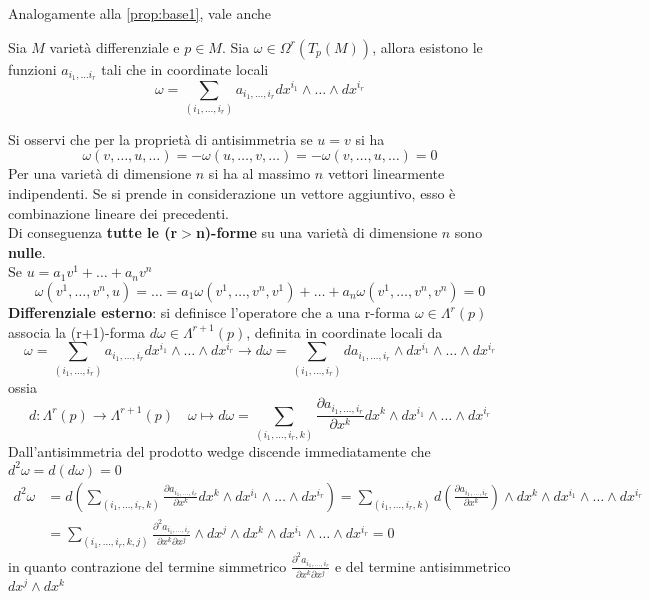 Analogamente alla \ref{prop:base1}, vale anche
\begin{proposition}\label{prop:base2}
   Sia $M$ varietà differenziale e $p \in M$. Sia $\omega \in \Omega^r(T_p(M))$,
   allora esistono le funzioni $a_{i_1,\dots i_r}$ tali che in coordinate locali\\
   $$
      \omega = \sum_{(i_1,\dots, i_r)} a_{i_1,\dots, i_r}
         dx^{i_1} \wedge \dots \wedge dx^{i_r}
   $$
\end{proposition}

Si osservi che per la proprietà di antisimmetria se $u = v$ si ha
$$\omega(v,\dots,u,\dots) = - \omega(u,\dots,v,\dots) = - \omega(v,\dots,u,\dots) = 0$$
Per una varietà di dimensione $n$ si ha al massimo $n$ vettori linearmente indipendenti.
Se si prende in considerazione un vettore aggiuntivo, esso è combinazione lineare dei precedenti.\\
Di conseguenza \textbf{tutte le (r$>$n)-forme} su una varietà di dimensione $n$ sono \textbf{nulle}.\\
Se $u= a_1v^1 + \dots + a_nv^n$
$$
   \omega(v^1,\dots,v^n,u) = \dots = a_1\omega(v^1,\dots,v^n,v^1) + \dots
      + a_n\omega(v^1,\dots,v^n,v^n) = 0
$$
\textbf{Differenziale esterno}: si definisce l'operatore che a una r-forma
$\omega \in \Lambda^r(p)$ associa la (r+1)-forma $d\omega \in \Lambda^{r+1}(p)$,
definita in coordinate locali da\\
$$
   \omega = \sum_{(i_1,\dots, i_r)} a_{i_1,\dots, i_r}
      dx^{i_1} \wedge \dots \wedge dx^{i_r} \to
   d\omega = \sum_{(i_1,\dots, i_r)} da_{i_1,\dots, i_r}\wedge
      dx^{i_1} \wedge \dots \wedge dx^{i_r}
$$
ossia
$$
   d : \Lambda^r(p) \to \Lambda^{r+1}(p) \quad \omega \mapsto
   d\omega = \sum_{(i_1,\dots, i_r,k)} \frac {\partial a_{i_1,\dots, i_r}}{\partial x^k} dx^k
   \wedge dx^{i_1} \wedge \dots \wedge dx^{i_r}
$$
Dall'antisimmetria del prodotto wedge discende immediatamente che $d^2\omega = d(d\omega) = 0$
\begin{equation*}
   \begin{split}
      d^2\omega & = d \left( \sum_{(i_1,\dots, i_r,k)}
            \frac {\partial a_{i_1,\dots, i_r}}{\partial x^k} dx^k
               \wedge dx^{i_1} \wedge \dots \wedge dx^{i_r} \right)
          = \sum_{(i_1,\dots, i_r,k)}
            d\left( \frac {\partial a_{i_1,\dots, i_r}}{\partial x^k} \right)
               \wedge dx^k \wedge dx^{i_1} \wedge \dots \wedge dx^{i_r} \\
       & = \sum_{(i_1,\dots, i_r,k,j)}
            \frac {\partial^2 a_{i_1,\dots, i_r}}{\partial x^k \partial x^j}
               \wedge dx^j \wedge dx^k \wedge dx^{i_1} \wedge \dots \wedge dx^{i_r}
         = 0
   \end{split}
\end{equation*}
in quanto contrazione del termine simmetrico $\frac {\partial^2 a_{i_1,\dots, i_r}}
{\partial x^k \partial x^j}$ e del termine antisimmetrico $dx^j \wedge dx^k $\\

